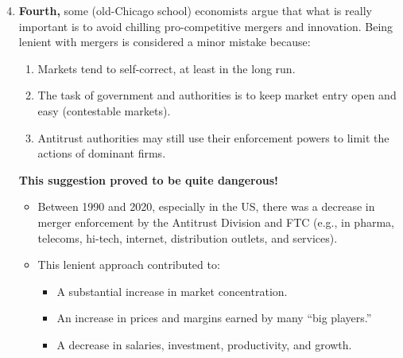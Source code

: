         \begin{enumerate}
        \setcounter{enumi}{3}
            \item \textbf{Fourth,} some (old-Chicago school) economists argue that what is really important is to avoid chilling pro-competitive mergers and innovation. Being lenient with mergers is considered a minor mistake because:
            \begin{enumerate}[label=(\alph*)]
                \item Markets tend to self-correct, at least in the long run.
                \item The task of government and authorities is to keep market entry open and easy (contestable markets).
                \item Antitrust authorities may still use their enforcement powers to limit the actions of dominant firms.
            \end{enumerate}
            \textbf{This suggestion proved to be quite dangerous!}
            \begin{itemize}
                \item Between 1990 and 2020, especially in the US, there was a decrease in merger enforcement by the Antitrust Division and FTC (e.g., in pharma, telecoms, hi-tech, internet, distribution outlets, and services).
                \item This lenient approach contributed to:
                \begin{itemize}
                    \item A substantial increase in market concentration.
                    \item An increase in prices and margins earned by many “big players.”
                    \item A decrease in salaries, investment, productivity, and growth.
                \end{itemize}
            \end{itemize}
        \end{enumerate}


